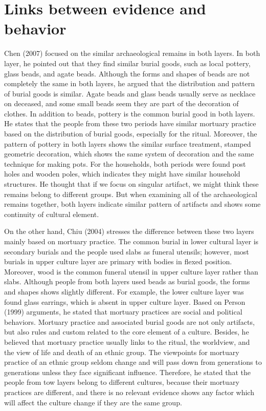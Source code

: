 \documentclass[10pt]{article}
\begin{document}
\section*{Links between evidence and
behavior}\label{links-between-evidence-and-behavior}

Chen (2007) focused on the similar archaeological remains in both
layers. In both layer, he pointed out that they find similar burial
goods, such as local pottery, glass beads, and agate beads. Although the
forms and shapes of beads are not completely the same in both layers, he
argued that the distribution and pattern of burial goods is similar.
Agate beads and glass beads usually serve as necklace on deceased, and
some small beads seem they are part of the decoration of clothes. In
addition to beads, pottery is the common burial good in both layers. He
states that the people from these two periods have similar mortuary
practice based on the distribution of burial goods, especially for the
ritual. Moreover, the pattern of pottery in both layers shows the
similar surface treatment, stamped geometric decoration, which shows the
same system of decoration and the same technique for making pots. For
the households, both periods were found post holes and wooden poles,
which indicates they might have similar household structures. He thought
that if we focus on singular artifact, we might think these remains
belong to different groups. But when examining all of the archaeological
remains together, both layers indicate similar pattern of artifacts and
shows some continuity of cultural element.

On the other hand, Chiu (2004) stresses the difference between these two
layers mainly based on mortuary practice. The common burial in lower
cultural layer is secondary burials and the people used slabs as funeral
utensils; however, most burials in upper culture layer are primary with
bodies in flexed position. Moreover, wood is the common funeral utensil
in upper culture layer rather than slabs. Although people from both
layers used beads as burial goods, the forms and shapes shows slightly
different. For example, the lower culture layer was found glass
earrings, which is absent in upper culture layer. Based on Person (1999)
arguments, he stated that mortuary practices are social and political
behaviors. Mortuary practice and associated burial goods are not only
artifacts, but also rules and custom related to the core element of a
culture. Besides, he believed that mortuary practice usually links to
the ritual, the worldview, and the view of life and death of an ethnic
group. The viewpoints for mortuary practice of an ethnic group seldom
change and will pass down from generations to generations unless they
face significant influence. Therefore, he stated that the people from
tow layers belong to different cultures, because their mortuary
practices are different, and there is no relevant evidence shows any
factor which will affect the culture change if they are the same group.
\end{document}
